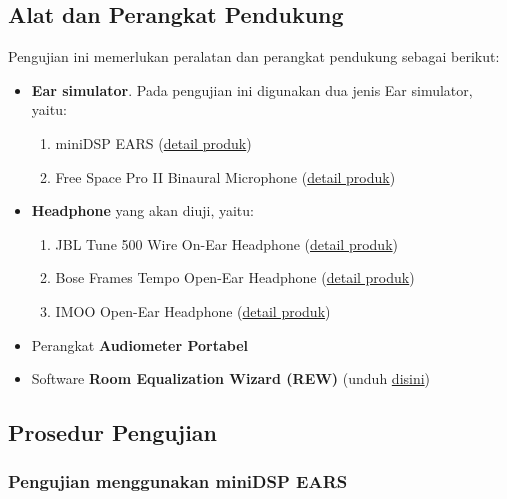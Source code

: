 \documentclass{article}
\begin{document}
	\subsection{Alat dan Perangkat Pendukung}
	Pengujian ini memerlukan peralatan dan perangkat pendukung sebagai berikut:
	\begin{itemize}
		\item \textbf{Ear simulator}. Pada pengujian ini digunakan dua jenis Ear simulator, yaitu:
		\begin{enumerate}
			\item miniDSP EARS (\href{https://www.minidsp.com/images/documents/Product%20Brief-EARS.pdf}{detail produk})
			\item Free Space Pro II Binaural Microphone (\href{https://3diosound.com/products/free-space-pro-binaural-microphone}{detail produk})
		\end{enumerate}
	
		\item \textbf{Headphone} yang akan diuji, yaitu:
		\begin{enumerate}
			\item JBL Tune 500 Wire On-Ear Headphone 
			(\href{https://id.jbl.com/over-ear-headphones/JBL+TUNE500.html}{detail produk})
			\item Bose Frames Tempo Open-Ear Headphone
			(\href{https://www.bose.com/en_us/products/frames/bose-frames-tempo.html#v=bose_frames_tempo_black_us}{detail produk})
			\item IMOO Open-Ear Headphone
			(\href{https://imoostore.com/pages/imoo-ear-care-headset}{detail produk})
		\end{enumerate}
	
		\item Perangkat {\bf Audiometer Portabel}
		
		\item Software \textbf{Room Equalization Wizard (REW)} (unduh \href{https://www.roomeqwizard.com/}{disini})
	\end{itemize}
	
	\subsection{Prosedur Pengujian}
	\subsubsection{Pengujian menggunakan miniDSP EARS}
\end{document}
